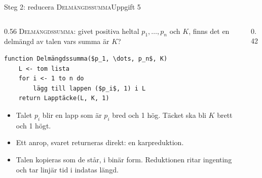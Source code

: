 \documentclass[aspectratio=169,10pt]{beamer}
\newcommand{\prob}[1]{\textsc{#1}}
\begin{document}
\begin{frame}[fragile]{Steg 2: reducera \prob{Delmängdssumma}}{Uppgift 5}
  \begin{columns}[T]
    \begin{column}{0.56\textwidth}
      \prob{Delmängdssumma}: givet positiva heltal $p_1,\dots,p_n$ och $K$, finns det en delmängd av talen vars summa är $K$?
\begin{lstlisting}
function Delmängdssumma($p_1, \dots, p_n$, K)
    L <- tom lista
    for i <- 1 to n do
        lägg till lappen ($p_i$, 1) i L
    return Lapptäcke(L, K, 1)
\end{lstlisting}
      \begin{itemize}
        \item<2-> Talet $p_i$ blir en lapp som är $p_i$ bred och 1 hög. Täcket ska bli $K$ brett och 1 högt.
        \item<3-> Ett anrop, svaret returneras direkt: en karpreduktion.
        \item<4-> Talen kopieras som de står, i binär form. Reduktionen ritar ingenting och tar linjär tid i indatas längd.
      \end{itemize}
    \end{column}
    \begin{column}{0.42\textwidth}
      \centering
    \end{column}
  \end{columns}
\end{frame}
\end{document}
